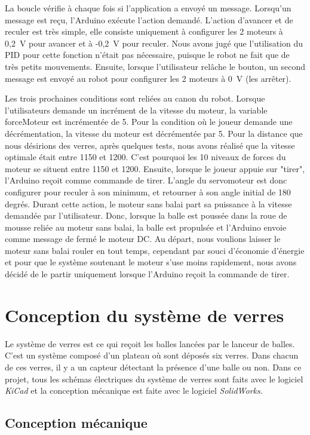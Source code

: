 La boucle vérifie à chaque fois si l’application a envoyé un message.
Lorsqu’un message est reçu, l’Arduino exécute l’action demandé.
L’action d’avancer et de reculer est très simple, elle consiste uniquement à configurer les 2 moteurs à 0,2~V pour avancer et à -0,2~V pour reculer.
Nous avons jugé que l’utilisation du PID pour cette fonction n’était pas nécessaire, puisque le robot ne fait que de très petits mouvements.
Ensuite, lorsque l’utilisateur relâche le bouton, un second message est envoyé au robot pour configurer les 2 moteurs à 0~V (les arrêter).

Les trois prochaines conditions sont reliées au canon du robot.
Lorsque l’utilisateurs demande un incrément de la vitesse du moteur, la variable forceMoteur est incrémentée de 5.
Pour la condition où le joueur demande une décrémentation, la vitesse du moteur est décrémentée par 5.
Pour la distance que nous désirions des verres, après quelques tests, nous avons réalisé que la vitesse optimale était entre 1150 et 1200.
C’est pourquoi les 10 niveaux de forces du moteur se situent entre 1150 et 1200.
Ensuite, lorsque le joueur appuie sur "tirer", l’Arduino reçoit comme commande de tirer.
L’angle du servomoteur est donc configurer pour reculer à son minimum, et retourner à son angle initial de 180 degrés.
Durant cette action, le moteur sans balai part sa puissance à la vitesse demandée par l’utilisateur.
Donc, lorsque la balle est poussée dans la roue de mousse reliée au moteur sans balai, la balle est propulsée et l’Arduino envoie comme message de fermé le moteur DC.
Au départ, nous voulions laisser le moteur sans balai rouler en tout temps, cependant par souci d’économie d’énergie et pour que le système soutenant le moteur s’use moins rapidement, nous avons décidé de le partir uniquement lorsque l’Arduino reçoit la commande de tirer.

\section{Conception du système de verres}

Le système de verres est ce qui reçoit les balles lancées par le lanceur de balles.
C’est un système composé d’un plateau où sont déposés six verres.
Dans chacun de ces verres, il y a un capteur détectant la présence d’une balle ou non.
Dans ce projet, tous les schémas électriques du système de verres sont faits avec le logiciel \emph{KiCad} et la conception mécanique est faite avec le logiciel \emph{SolidWorks}.

\subsection{Conception mécanique}

